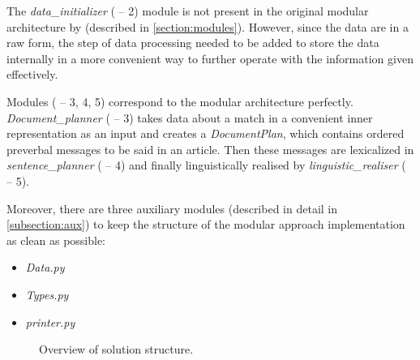 The \emph{data\_initializer} ( -- 2) module is not present in the original modular architecture by \cite{reiter1997building} (described in \ref{section:modules}). However, since the data are in a raw form, the step of data processing needed to be added to store the data internally in a more convenient way to further operate with the information given effectively.

Modules ( -- 3, 4, 5) correspond to the modular architecture perfectly. \emph{Document\_planner} ( -- 3) takes data about a match in a convenient inner representation as an input and creates a \emph{DocumentPlan}, which contains ordered preverbal messages to be said in an article. Then these messages are lexicalized in \emph{sentence\_planner} ( -- 4) and finally linguistically realised by \emph{linguistic\_realiser} ( -- 5). 

Moreover, there are three auxiliary modules (described in detail in \ref{subsection:aux}) to keep the structure of the modular approach implementation as clean as possible:
\begin{itemize}
	\item \emph{Data.py}
	\item \emph{Types.py}
	\item \emph{printer.py}
\end{itemize}

\begin{figure}[H]
	\caption{Overview of solution structure.}
	\label{fig:structure}
\end{figure}

